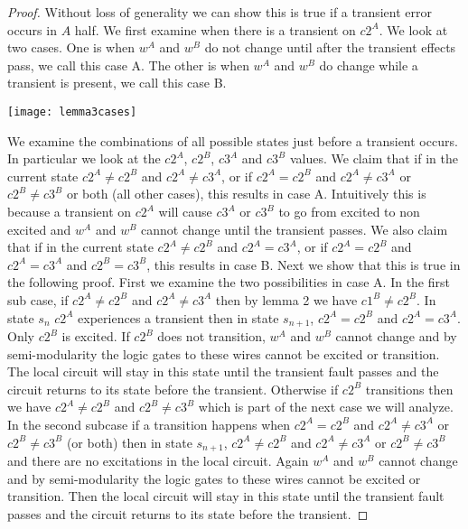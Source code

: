 \documentclass{article}
\begin{document}
\begin{proof}
Without loss of generality we can show this is true if a transient error occurs in $A$ half.  %
We first examine when there is a transient on $c2^A$.  We look at two cases.  One is when $w^A$ and $w^B$ do not change until after the transient effects pass, we call this case A.  The other is when $w^A$ and $w^B$ do change while a transient is present, we call this case B. \newline
\begin{center}
\texttt{[image: lemma3cases]}
\end{center} \newline
We examine the combinations of all possible states just before a transient occurs.  In particular we look at the $c2^A$, $c2^B$, $c3^A$ and $c3^B$ values.  We claim that if in the current state $c2^A \neq c2^B$ and $c2^A \neq c3^A$, or if $c2^A=c2^B$ and $c2^A\neq c3^A$ or $c2^B\neq c3^B$ or both (all other cases), this results in case A.  Intuitively this is because a transient on $c2^A$ will cause $c3^A$ or $c3^B$ to go from excited to non excited and $w^A$ and $w^B$ cannot change until the transient passes.  We also claim that if in the current state $c2^A \neq c2^B$ and $c2^A=c3^A$, or if $c2^A=c2^B$ and $c2^A=c3^A$ and $c2^B=c3^B$, this results in case B. \newline
Next we show that this is true in the following proof.  First we examine the two possibilities in case A.  In the first sub case, if $c2^A \neq c2^B$ and $c2^A \neq c3^A$ then by lemma 2 we have $c1^B\neq c2^B$.
 In state $s_n$ $c2^A$ experiences a transient then in state $s_{n+1}$, $c2^A=c2^B$ and $c2^A=c3^A$.  Only $c2^B$ is excited.  If $c2^B$ does not transition, $w^A$ and $w^B$ cannot change and by semi-modularity the logic gates to these wires cannot be excited or transition. The local circuit will stay in this state until the transient fault passes and the circuit returns to its state before the transient.  Otherwise if $c2^B$ transitions then we have $c2^A\neq c2^B$ and $c2^B \neq c3^B$ which is part of the next case we will analyze.
In the second subcase if a transition happens when $c2^A=c2^B$ and $c2^A\neq c3^A$ or $c2^B\neq c3^B$ (or both) then in state $s_{n+1}$, $c2^A\neq c2^B$ and $c2^A\neq c3^A$ or $c2^B\neq c3^B$ and there are no excitations in the local circuit.  Again $w^A$ and $w^B$ cannot change and by semi-modularity the logic gates to these wires cannot be excited or transition.  Then the local circuit will stay in this state until the transient fault passes and the circuit returns to its state before the transient. \newline

\end{proof}
\end{document}
